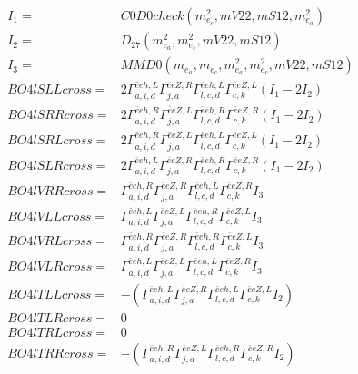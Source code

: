 \documentclass[A4,landscape]{article}
\begin{document}
\begin{align} 
I_1 = & C0D0check(m^2_{e_{{c}}}, mV22, mS12, m^2_{e_{{a}}}) \\ 
I_2 = & D_{27}(m^2_{e_{{a}}}, m^2_{e_{{c}}}, mV22, mS12) \\ 
I_3 = & MMD0(m_{e_{{a}}}, m_{e_{{c}}}, m^2_{e_{{a}}}, m^2_{e_{{c}}}, mV22, mS12) \\ 
  BO4lSLLcross= & 2  \Gamma^{\bar{e}e h ,L}_{a, i, d} \Gamma^{\bar{e}e Z ,R}_{j, a} \Gamma^{\bar{e}e h ,L}_{l, c, d} \Gamma^{\bar{e}e Z ,L}_{c, k} (I_1 - 2 I_2) \\ 
  BO4lSRRcross= & 2  \Gamma^{\bar{e}e h ,R}_{a, i, d} \Gamma^{\bar{e}e Z ,L}_{j, a} \Gamma^{\bar{e}e h ,R}_{l, c, d} \Gamma^{\bar{e}e Z ,R}_{c, k} (I_1 - 2 I_2) \\ 
  BO4lSRLcross= & 2  \Gamma^{\bar{e}e h ,R}_{a, i, d} \Gamma^{\bar{e}e Z ,L}_{j, a} \Gamma^{\bar{e}e h ,L}_{l, c, d} \Gamma^{\bar{e}e Z ,L}_{c, k} (I_1 - 2 I_2) \\ 
  BO4lSLRcross= & 2  \Gamma^{\bar{e}e h ,L}_{a, i, d} \Gamma^{\bar{e}e Z ,R}_{j, a} \Gamma^{\bar{e}e h ,R}_{l, c, d} \Gamma^{\bar{e}e Z ,R}_{c, k} (I_1 - 2 I_2) \\ 
  BO4lVRRcross= &  \Gamma^{\bar{e}e h ,R}_{a, i, d} \Gamma^{\bar{e}e Z ,R}_{j, a} \Gamma^{\bar{e}e h ,L}_{l, c, d} \Gamma^{\bar{e}e Z ,R}_{c, k} I_3 \\ 
  BO4lVLLcross= &  \Gamma^{\bar{e}e h ,L}_{a, i, d} \Gamma^{\bar{e}e Z ,L}_{j, a} \Gamma^{\bar{e}e h ,R}_{l, c, d} \Gamma^{\bar{e}e Z ,L}_{c, k} I_3 \\ 
  BO4lVRLcross= &  \Gamma^{\bar{e}e h ,R}_{a, i, d} \Gamma^{\bar{e}e Z ,R}_{j, a} \Gamma^{\bar{e}e h ,R}_{l, c, d} \Gamma^{\bar{e}e Z ,L}_{c, k} I_3 \\ 
  BO4lVLRcross= &  \Gamma^{\bar{e}e h ,L}_{a, i, d} \Gamma^{\bar{e}e Z ,L}_{j, a} \Gamma^{\bar{e}e h ,L}_{l, c, d} \Gamma^{\bar{e}e Z ,R}_{c, k} I_3 \\ 
  BO4lTLLcross= & -( \Gamma^{\bar{e}e h ,L}_{a, i, d} \Gamma^{\bar{e}e Z ,R}_{j, a} \Gamma^{\bar{e}e h ,L}_{l, c, d} \Gamma^{\bar{e}e Z ,L}_{c, k} I_2) \\ 
  BO4lTLRcross= & 0 \\ 
  BO4lTRLcross= & 0 \\ 
  BO4lTRRcross= & -( \Gamma^{\bar{e}e h ,R}_{a, i, d} \Gamma^{\bar{e}e Z ,L}_{j, a} \Gamma^{\bar{e}e h ,R}_{l, c, d} \Gamma^{\bar{e}e Z ,R}_{c, k} I_2) \\ 
\end{align} 
\end{document}
